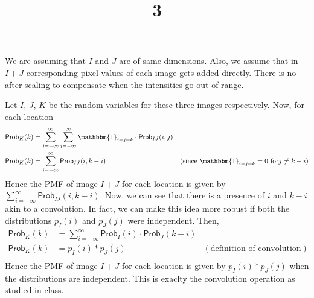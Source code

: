 \documentclass[a4paper]{article}
\title{3}
\date{}
\renewcommand{\P}{\textsf{Prob}}
\begin{document}
\maketitle
We are assuming that $I$ and $J$ are of same dimensions. Also, we assume that in $I+J$ corresponding pixel values of each image gets added directly. There is no after-scaling to compensate when the intensities go out of range.

Let $I$, $J$, $K$ be the random variables for these three images respectively. Now, for each location
\begin{equation}
	\begin{aligned}
		\P_K(k) &= \sum_{i=-\infty}^{\infty}\sum_{j=-\infty}^{\infty} \mathbbm{1}_{i+j=k} \cdot \P_{IJ}(i,j) &\\
		\P_K(k) &= \sum_{i=-\infty}^{\infty} \P_{IJ}(i,k-i) &(\text{since } \mathbbm{1}_{i+j=k} = 0 \text{ for} j\neq k-i)
	\end{aligned}
\end{equation}
Hence the PMF of image $I+J$ for each location is given by $\displaystyle\sum_{i=-\infty}^{\infty} \P_{IJ}(i,k-i)$. Now, we can see that there is a presence of $i$ and $k-i$ akin to a convolution. In fact, we can make this idea more robust if both the distributions $p_I(i)$ and $p_J(j)$ were independent. Then, 
\begin{equation}
	\begin{aligned}
		\P_K(k) &= \sum_{i=-\infty}^{\infty} \P_{I}(i) \cdot \P_{J}(k-i) &\\
		\P_K(k) &= p_I(i) \ast p_J(j) &(\text{definition of convolution})\\
	\end{aligned}
\end{equation}
Hence the PMF of image $I+J$ for each location is given by $p_I(i) \ast p_J(j)$ when the distributions are independent. This is exaclty the convolution operation as studied in class.
\end{document}
